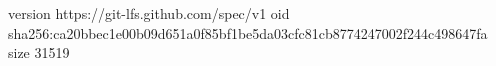 version https://git-lfs.github.com/spec/v1
oid sha256:ca20bbec1e00b09d651a0f85bf1be5da03cfc81cb8774247002f244c498647fa
size 31519
